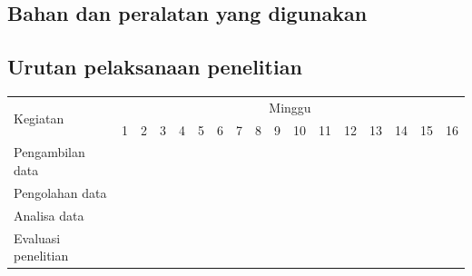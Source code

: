 \subsection{Bahan dan peralatan yang digunakan}

\lipsum[13]

\subsection{Urutan pelaksanaan penelitian}

\newcommand{\w}{}
\newcommand{\G}{\cellcolor{gray}}
\begin{table}[h!]
  \begin{tabular}{|p{3.5cm}|c|c|c|c|c|c|c|c|c|c|c|c|c|c|c|c|}

    \hline
    \multirow{2}{*}{Kegiatan} & \multicolumn{16}{|c|}{Minggu} \\
    \cline{2-17} &
    1 & 2 & 3 & 4 & 5 & 6 & 7 & 8 & 9 & 10 & 11 & 12 & 13 & 14 & 15 & 16 \\
    \hline

    Pengambilan data &
    \G & \G & \G & \G & \w & \w & \w & \w & \w & \w & \w & \w & \w & \w & \w & \w \\
    \hline

    Pengolahan data &
    \w & \w & \w & \w & \G & \G & \G & \G & \w & \w & \w & \w & \w & \w & \w & \w \\
    \hline

    Analisa data &
    \w & \w & \w & \w & \w & \w & \w & \w & \G & \G & \G & \G & \w & \w & \w & \w \\
    \hline

    Evaluasi penelitian &
    \w & \w & \w & \w & \w & \w & \w & \w & \w & \w & \w & \w & \G & \G & \G & \G \\
    \hline

  \end{tabular}
\end{table}

